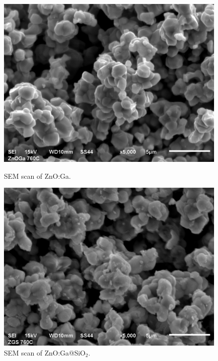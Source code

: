 \begin{figure}
    \centering
        \hspace*{\fill}%
    \begin{minipage}{.3\textwidth}
        \includegraphics[width=\textwidth]{pictures/sem_ZnOGa_5_mikro.png}
        \caption{SEM scan of ZnO:Ga.}
        \label{fig:sem_znoga}
    \end{minipage}
      \hspace{\fill}%
    \begin{minipage}{.3\textwidth}
        \includegraphics[width=\textwidth]{pictures/sem_ZGS_5_mikro.png}
        \caption{SEM scan of ZnO:Ga@SiO$_{2}$.}
        \label{fig:sem_zgs}
    \end{minipage}

\end{figure}
